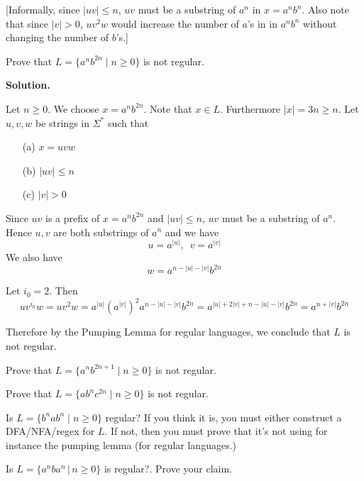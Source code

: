 [Informally,
since $|uv| \leq n$, $uv$ must be a substring of $a^n$ in $x = a^nb^n$.
Also note that since $|v| > 0$, $uv^2w$ would increase
the number of $a$'s in in $a^nb^n$ without changing the number of
$b$'s.]


\newpage
\begin{ex}
Prove that $L = \{a^n b^{2n} \mid n\geq 0 \}$ is not regular.
\end{ex}

\textbf{Solution.}

Let $n \geq 0$.
We choose $x = a^n b^{2n}$. Note that $x \in L$.
Furthermore $|x| = 3n \geq n$.
Let $u,v,w$ be strings in $\Sigma^*$ such that
\begin{enumerate}[label=\textnormal{(\alph*)},itemsep=0pt,nosep,noitemsep,partopsep=0pt,topsep=0pt,parsep=0pt]
 \item[(a)] $x = uvw$
 \item[(b)] $|uv| \leq n$
 \item[(c)] $|v| > 0$
\end{enumerate}
 
Since $uv$ is a prefix of $x = a^n b^{2n}$
and $|uv| \leq n$, $uv$ must be a substring of $a^n$.
Hence $u,v$ are both substrings of $a^n$ and we have
\[
u = a^{|u|}, \,\,\, 
v = a^{|v|}
\]
We also have
\[
w = a^{n - |u| - |v|} b^{2n}
\]

Let $i_0 = 2$. Then
\[
uv^{i_0}w
= uv^2w 
= a^{|u|} (a^{|v|})^2 a^{n - |u| - |v|} b^{2n}
= a^{|u| + 2|v| + n - |u| - |v|} b^{2n}
= a^{n + |v|} b^{2n}
\]

Therefore by the Pumping Lemma for regular languages, we 
conclude that $L$ is not regular.

\newpage
\begin{ex}
Prove that $L = \{a^n b^{2n+1} \mid n\geq 0 \}$ is not regular.
\end{ex}

\newpage
\begin{ex}
Prove that $L = \{a b^n c^{2n} \mid n \geq 0 \}$ is not regular.
\end{ex}

\newpage
\begin{ex}
Is $L = \{b^n a b^n \mid n \geq 0 \}$ regular?
If you think it is, you must either construct a DFA/NFA/regex for $L$.
If not, then you must prove that it's not using for instance the
pumping lemma (for regular languages.)
\end{ex}

\newpage
\begin{ex}
Is $L = \{a^nba^n\,|\, n \geq 0\}$ is regular?.
Prove your claim.
\end{ex}

